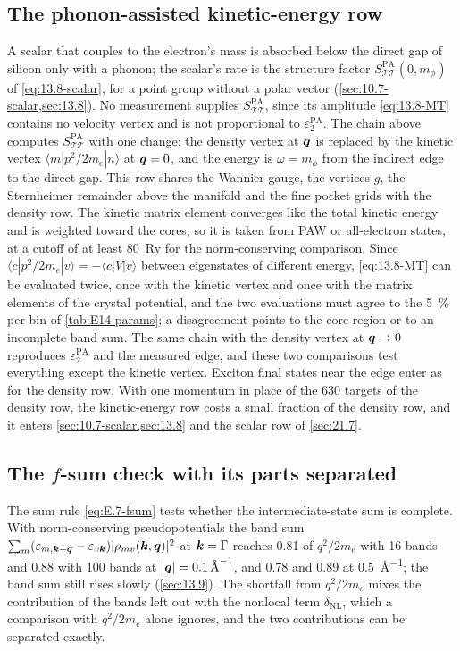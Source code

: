 \subsection{The phonon-assisted kinetic-energy row}

A scalar that couples to the electron's mass is absorbed below the direct gap of silicon only with a phonon; the scalar's rate is the structure factor $S^{\mathrm{PA}}_{\mathcal{T}\mathcal{T}}(0,m_\phi)$ of \cref{eq:13.8-scalar}, for a point group without a polar vector (\cref{sec:10.7-scalar,sec:13.8}). No measurement supplies $S^{\mathrm{PA}}_{\mathcal{T}\mathcal{T}}$, since its amplitude \cref{eq:13.8-MT} contains no velocity vertex and is not proportional to $\varepsilon_2^{\mathrm{PA}}$. The chain above computes $S^{\mathrm{PA}}_{\mathcal{T}\mathcal{T}}$ with one change: the density vertex at $\bm{q}$ is replaced by the kinetic vertex $\langle m|p^2/2m_e|n\rangle$ at $\bm{q} = 0$, and the energy is $\omega = m_\phi$ from the indirect edge to the direct gap. This row shares the Wannier gauge, the vertices $g$, the Sternheimer remainder above the manifold and the fine pocket grids with the density row. The kinetic matrix element converges like the total kinetic energy and is weighted toward the cores, so it is taken from PAW or all-electron states, at a cutoff of at least \SI{80}{Ry} for the norm-conserving comparison. Since $\langle c|p^2/2m_e|v\rangle = -\langle c|V|v\rangle$ between eigenstates of different energy, \cref{eq:13.8-MT} can be evaluated twice, once with the kinetic vertex and once with the matrix elements of the crystal potential, and the two evaluations must agree to the \SI{5}{\percent} per bin of \cref{tab:E14-params}; a disagreement points to the core region or to an incomplete band sum. The same chain with the density vertex at $\bm{q}\to0$ reproduces $\varepsilon_2^{\mathrm{PA}}$ and the measured edge, and these two comparisons test everything except the kinetic vertex. Exciton final states near the edge enter as for the density row. With one momentum in place of the 630 targets of the density row, the kinetic-energy row costs a small fraction of the density row, and it enters \cref{sec:10.7-scalar,sec:13.8} and the scalar row of \cref{sec:21.7}.

\subsection{The \texorpdfstring{$f$}{f}-sum check with its parts separated}

The sum rule \cref{eq:E.7-fsum} tests whether the intermediate-state sum is complete. With norm-conserving pseudopotentials the band sum $\sum_m(\varepsilon_{m,\bm{k}+\bm{q}} - \varepsilon_{v\bm{k}})|\rho_{mv}(\bm{k},\bm{q})|^2$ at $\bm{k} = \mathrm{\Gamma}$ reaches 0.81 of $q^2/2m_e$ with 16 bands and 0.88 with 100 bands at $|\bm{q}| = \SI{0.1}{\angstrom^{-1}}$, and 0.78 and 0.89 at \SI{0.5}{\angstrom^{-1}}; the band sum still rises slowly (\cref{sec:13.9}). The shortfall from $q^2/2m_e$ mixes the contribution of the bands left out with the nonlocal term $\delta_{\mathrm{NL}}$, which a comparison with $q^2/2m_e$ alone ignores, and the two contributions can be separated exactly.

